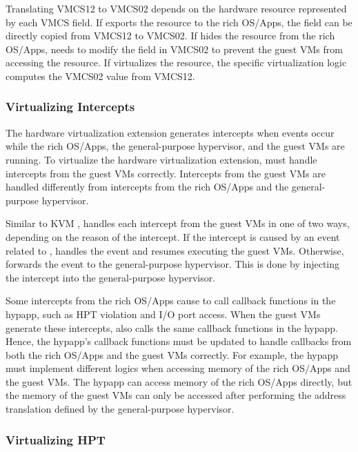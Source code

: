 Translating VMCS12 to VMCS02 depends on the hardware resource represented by each VMCS field. If  exports the resource to the rich OS/Apps, the field can be directly copied from VMCS12 to VMCS02. If  hides the resource from the rich OS/Apps,  needs to modify the field in VMCS02 to prevent the guest VMs from accessing the resource. If  virtualizes the resource, the specific virtualization logic computes the VMCS02 value from VMCS12.

\subsubsection{Virtualizing Intercepts}

The hardware virtualization extension generates intercepts when events occur while the rich OS/Apps, the general-purpose hypervisor, and the guest VMs are running. To virtualize the hardware virtualization extension,  must handle intercepts from the guest VMs correctly. Intercepts from the guest VMs are handled differently from intercepts from the rich OS/Apps and the general-purpose hypervisor.

Similar to KVM \cite{ben2010turtles},  handles each intercept from the guest VMs in one of two ways, depending on the reason of the intercept. If the intercept is caused by an event related to ,  handles the event and resumes executing the guest VMs. Otherwise,  forwards the event to the general-purpose hypervisor. This is done by injecting the intercept into the general-purpose hypervisor.

Some intercepts from the rich OS/Apps cause  to call callback functions in the hypapp, such as HPT violation and I/O port access. When the guest VMs generate these intercepts,  also calls the same callback functions in the hypapp. Hence, the hypapp's callback functions must be updated to handle callbacks from both the rich OS/Apps and the guest VMs correctly. For example, the hypapp must implement different logics when accessing memory of the rich OS/Apps and the guest VMs. The hypapp can access memory of the rich OS/Apps directly, but the memory of the guest VMs can only be accessed after performing the address translation defined by the general-purpose hypervisor.

\subsubsection{Virtualizing HPT}

